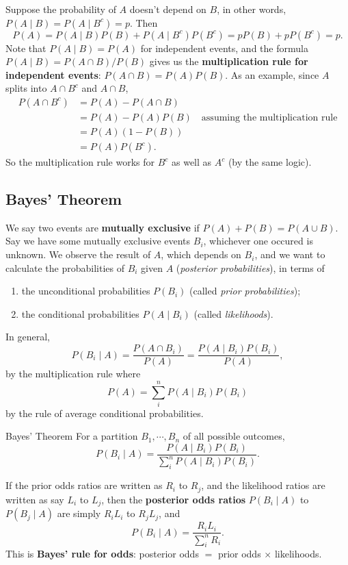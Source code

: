Suppose the probability of $A$ doesn't depend on $B$, in other words, $P(A \mid B)=P(A \mid B^{c})=p$. Then \[
    P(A)=P(A\mid B)P(B)+P(A\mid B^{c})P(B^{c})=p P(B)+p P(B ^{c})=p.
\] Note that $P(A \mid B)=P(A)$ for independent events, and the formula $P(A \mid B)= P(A \cap B) / P(B)$ gives us the \textbf{multiplication rule for independent events}: $P(A \cap B)=P(A)P(B)$. As an example, since $A $ splits into $A \cap B^{c}$ and $A \cap B$, 
\begin{align*}
    P(A\cap B^{c})&= P(A)-P(A \cap B)\\
                  &=P(A)-P(A)P(B) \quad \text{assuming the multiplication rule} \\
                  &=P(A)(1-P(B))\\
                  &=P(A)P(B^{c}).
\end{align*}So the multiplication rule works for $B^{c}$ as well as $A^{c}$ (by the same logic).

\subsection{Bayes' Theorem}
We say two events are \textbf{mutually exclusive} if $P(A)+P(B)=P(A \cup B)$. Say we have some mutually exclusive events $B_i $, whichever one occured is unknown. We observe the result of $A$, which depends on $B_i $, and we want to calculate the probabilities of $B_i $ given $A$ (\emph{posterior probabilities}), in terms of 
\begin{enumerate}[label=(\roman*)]
\setlength\itemsep{-.2em}
    \item the unconditional probabilities $P(B_i )$ (called \emph{prior probabilities});
    \item the conditional probabilities $P(A \mid B_i )$ (called \emph{likelihoods}).
\end{enumerate}In general, \[
P(B_i  \mid A)= \frac{P(A \cap B_i )}{P(A)}= \frac{P(A \mid B_i )P(B_i )}{P(A)},
\] by the multiplication rule where \[
P(A)=\sum _i^n  P(A \mid B_i )P(B_i )
\] by the rule of average conditional probabilities.
\begin{namedthm}{Bayes' Theorem} 
    For a partition $B_1 ,\cdots ,B_n $ of all possible outcomes, \[
        P(B_i \mid A)= \frac{P(A \mid B_i )P(B_i )}{\sum _i ^n  P(A \mid B_i )P(B_i )}.
    \]  
\end{namedthm}
If the prior odds ratios are written as $R_i $ to $R_j $, and the likelihood ratios are written as say $L_i $ to $L_j $, then the \textbf{posterior odds ratios} $P(B_i  \mid A)$ to $P(B_j  \mid A)$ are simply $R_i L_i $ to $R_j L_j $, and \[
    P(B_i  \mid A) = \frac{R_i L_i }{\sum _i ^n R_i }.
\] This is \textbf{Bayes' rule for odds}: posterior odds $=$ prior odds $\times $ likelihoods.

